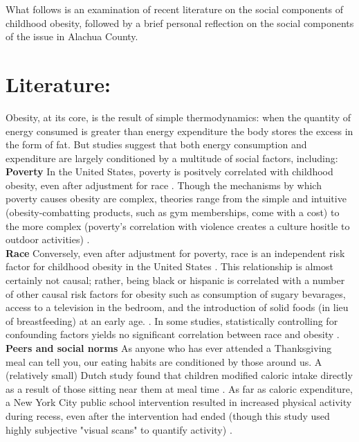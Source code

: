 \begin{multicols}{2}
What follows is an examination of recent literature on the social components of childhood obesity, followed by a brief personal reflection on the social components of the issue in Alachua County.

\section*{Literature: }

Obesity, at its core, is the result of simple thermodynamics: when the quantity of energy consumed is greater than energy expenditure the body stores the excess in the form of fat.  But studies suggest that both energy consumption and expenditure are largely conditioned by a multitude of social factors, including:\\

\textbf{Poverty} In the United States, poverty is positvely correlated with childhood obesity, even after adjustment for race \cite{Pan2012}.  Though the mechanisms by which poverty causes obesity are complex, theories range from the simple and intuitive (obesity-combatting products, such as gym memberships, come with a cost) to the more complex (poverty's correlation with violence creates a culture hositle to outdoor activities) \cite{Levine2011}.  \\

\textbf{Race} Conversely, even after adjustment for poverty, race is an independent risk factor for childhood obesity in the United States \cite{Ogden2014}.  This relationship is almost certainly not causal; rather, being black or hispanic is correlated with a number of other causal risk factors for obesity such as consumption of sugary bevarages, access to a television in the bedroom, and the introduction of solid foods (in lieu of breastfeeding) at an early age. \cite{Taveras2010}.  In some studies, statistically controlling for confounding factors yields no significant correlation between race and obesity \cite{Zilanawala2014}.   \\

\textbf{Peers and social norms} As anyone who has ever attended a Thanksgiving meal can tell you, our eating habits are conditioned by those around us.  A (relatively small) Dutch study found that children modified caloric intake directly as a result of those sitting near them at meal time \cite{Bevelander2012}.  As far as caloric expenditure, a New York City public school intervention resulted in increased physical activity during recess, even after the intervention had ended (though this study used highly subjective "visual scans" to quantify activity)  \cite{Chin2013}. \\


\end{multicols}
